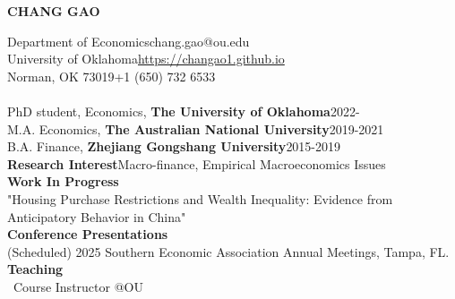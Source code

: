 \documentclass[12pt,letterpaper]{article}
\begin{document}
	\begin{center}
		{\bf\LARGE CHANG GAO}
	\end{center}
	\noindent Department of Economics\hfill chang.gao@ou.edu\medskip\\
	University of Oklahoma\hfill\href{https://changao1.github.io}{https://changao1.github.io}\medskip\\
Norman, OK   73019\hfill+1 (650) 732 6533\bigskip\\
	\medskip\\
	PhD student, Economics, {\bf The University of Oklahoma}\hfill2022-\medskip\\
    M.A. Economics, {\bf The Australian National University}\hfill2019-2021\medskip\\
	B.A. Finance, {\bf Zhejiang Gongshang University}\hfill2015-2019\bigskip\\
	{\bf Research Interest}\hfill Macro-finance, Empirical Macroeconomics Issues\bigskip\\
	{\bf Work In Progress}\medskip\\
"Housing Purchase Restrictions and Wealth Inequality: Evidence from Anticipatory Behavior in China"\medskip\\
{\bf Conference Presentations}\medskip\\
(Scheduled) 2025 Southern Economic Association Annual Meetings, Tampa, FL. \bigskip\\
	{\bf Teaching}\medskip\\
	{\ Course Instructor @OU}
	
\end{document}
